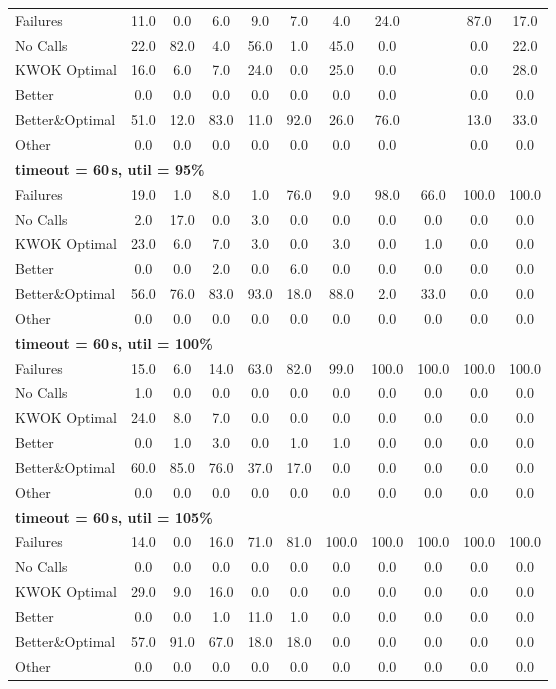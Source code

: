 \begin{tabular}{l cccccccccc}
\midrule
Failures & 11.0 & 0.0 & 6.0 & 9.0 & 7.0 & 4.0 & 24.0 & \text{--} & 87.0 & 17.0 \\
No Calls & 22.0 & 82.0 & 4.0 & 56.0 & 1.0 & 45.0 & 0.0 & \text{--} & 0.0 & 22.0 \\
KWOK Optimal & 16.0 & 6.0 & 7.0 & 24.0 & 0.0 & 25.0 & 0.0 & \text{--} & 0.0 & 28.0 \\
Better & 0.0 & 0.0 & 0.0 & 0.0 & 0.0 & 0.0 & 0.0 & \text{--} & 0.0 & 0.0 \\
Better\&Optimal & 51.0 & 12.0 & 83.0 & 11.0 & 92.0 & 26.0 & 76.0 & \text{--} & 13.0 & 33.0 \\
Other & 0.0 & 0.0 & 0.0 & 0.0 & 0.0 & 0.0 & 0.0 & \text{--} & 0.0 & 0.0 \\
\midrule
\multicolumn{11}{l}{\textbf{timeout = 60\,s, util = 95\%}} \\
\midrule
Failures & 19.0 & 1.0 & 8.0 & 1.0 & 76.0 & 9.0 & 98.0 & 66.0 & 100.0 & 100.0 \\
No Calls & 2.0 & 17.0 & 0.0 & 3.0 & 0.0 & 0.0 & 0.0 & 0.0 & 0.0 & 0.0 \\
KWOK Optimal & 23.0 & 6.0 & 7.0 & 3.0 & 0.0 & 3.0 & 0.0 & 1.0 & 0.0 & 0.0 \\
Better & 0.0 & 0.0 & 2.0 & 0.0 & 6.0 & 0.0 & 0.0 & 0.0 & 0.0 & 0.0 \\
Better\&Optimal & 56.0 & 76.0 & 83.0 & 93.0 & 18.0 & 88.0 & 2.0 & 33.0 & 0.0 & 0.0 \\
Other & 0.0 & 0.0 & 0.0 & 0.0 & 0.0 & 0.0 & 0.0 & 0.0 & 0.0 & 0.0 \\
\midrule
\multicolumn{11}{l}{\textbf{timeout = 60\,s, util = 100\%}} \\
\midrule
Failures & 15.0 & 6.0 & 14.0 & 63.0 & 82.0 & 99.0 & 100.0 & 100.0 & 100.0 & 100.0 \\
No Calls & 1.0 & 0.0 & 0.0 & 0.0 & 0.0 & 0.0 & 0.0 & 0.0 & 0.0 & 0.0 \\
KWOK Optimal & 24.0 & 8.0 & 7.0 & 0.0 & 0.0 & 0.0 & 0.0 & 0.0 & 0.0 & 0.0 \\
Better & 0.0 & 1.0 & 3.0 & 0.0 & 1.0 & 1.0 & 0.0 & 0.0 & 0.0 & 0.0 \\
Better\&Optimal & 60.0 & 85.0 & 76.0 & 37.0 & 17.0 & 0.0 & 0.0 & 0.0 & 0.0 & 0.0 \\
Other & 0.0 & 0.0 & 0.0 & 0.0 & 0.0 & 0.0 & 0.0 & 0.0 & 0.0 & 0.0 \\
\midrule
\multicolumn{11}{l}{\textbf{timeout = 60\,s, util = 105\%}} \\
\midrule
Failures & 14.0 & 0.0 & 16.0 & 71.0 & 81.0 & 100.0 & 100.0 & 100.0 & 100.0 & 100.0 \\
No Calls & 0.0 & 0.0 & 0.0 & 0.0 & 0.0 & 0.0 & 0.0 & 0.0 & 0.0 & 0.0 \\
KWOK Optimal & 29.0 & 9.0 & 16.0 & 0.0 & 0.0 & 0.0 & 0.0 & 0.0 & 0.0 & 0.0 \\
Better & 0.0 & 0.0 & 1.0 & 11.0 & 1.0 & 0.0 & 0.0 & 0.0 & 0.0 & 0.0 \\
Better\&Optimal & 57.0 & 91.0 & 67.0 & 18.0 & 18.0 & 0.0 & 0.0 & 0.0 & 0.0 & 0.0 \\
Other & 0.0 & 0.0 & 0.0 & 0.0 & 0.0 & 0.0 & 0.0 & 0.0 & 0.0 & 0.0 \\
\bottomrule
\end{tabular}
